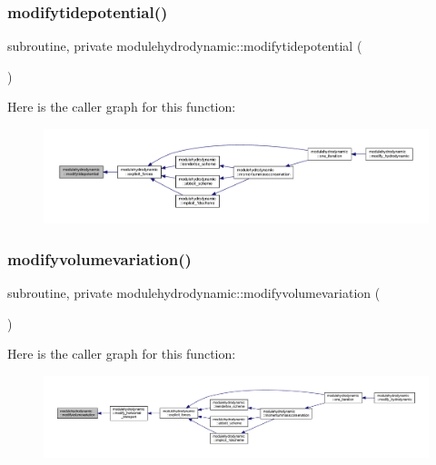 \subsubsection{\texorpdfstring{modifytidepotential()}{modifytidepotential()}}
{\footnotesize\ttfamily subroutine, private modulehydrodynamic\+::modifytidepotential (\begin{DoxyParamCaption}{ }\end{DoxyParamCaption})\hspace{0.3cm}{\ttfamily [private]}}

Here is the caller graph for this function\+:\nopagebreak
\begin{figure}[H]
\begin{center}
\leavevmode
\includegraphics[width=350pt]{namespacemodulehydrodynamic_af96ad695325003d3a6068df53933c723_icgraph}
\end{center}
\end{figure}
\mbox{\label{namespacemodulehydrodynamic_a4d5f643e0f8ee69139183ed0bd4a9482}} 
\subsubsection{\texorpdfstring{modifyvolumevariation()}{modifyvolumevariation()}}
{\footnotesize\ttfamily subroutine, private modulehydrodynamic\+::modifyvolumevariation (\begin{DoxyParamCaption}{ }\end{DoxyParamCaption})\hspace{0.3cm}{\ttfamily [private]}}

Here is the caller graph for this function\+:\nopagebreak
\begin{figure}[H]
\begin{center}
\leavevmode
\includegraphics[width=350pt]{namespacemodulehydrodynamic_a4d5f643e0f8ee69139183ed0bd4a9482_icgraph}
\end{center}
\end{figure}
\mbox{\label{namespacemodulehydrodynamic_a3efd394333f3dd01635ae28bbea6dd28}} 
